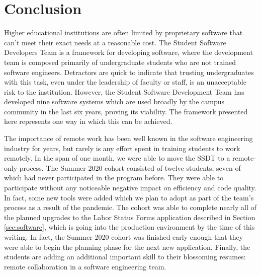 \section{Conclusion}

Higher educational institutions are often limited by proprietary software that can't meet their exact needs at a reasonable cost. The Student Software Developers Team is a framework for developing software, where the development team is composed primarily of undergraduate students who are not trained software engineers. Detractors are quick to indicate that trusting undergraduates with this task, even under the leadership of faculty or staff, is an unacceptable risk to the institution. However, the Student Software Development Team has developed nine software systems which are used broadly by the campus community in the last six years, proving its viability. The framework presented here represents one way in which this can be achieved.

The importance of remote work has been well known in the software engineering industry for years, but rarely is any effort spent in training students to work remotely. In the span of one month, we were able to move the SSDT to a remote-only process. The Summer 2020 cohort consisted of twelve students, seven of which had never participated in the program before. They were able to participate without any noticeable negative impact on efficiency and code quality. In fact, some new tools were added which we plan to adopt as part of the team's process as a result of the pandemic. The cohort was able to complete nearly all of the planned upgrades to the Labor Status Forms application described in Section \ref{sec:software}, which is going into the production environment by the time of this writing. In fact, the Summer 2020 cohort was finished early enough that they were able to begin the planning phase for the next new application. Finally, the students are adding an additional important skill to their blossoming resumes: remote collaboration in a software engineering team.

